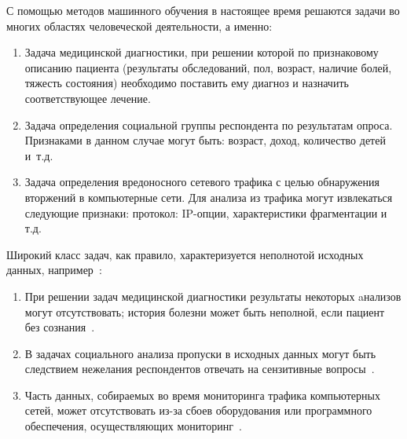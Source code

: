 
{\actuality} С помощью методов машинного обучения в настоящее время
решаются задачи во многих областях человеческой деятельности, а
именно:
\begin{enumerate}
  \item Задача медицинской диагностики, при решении которой по
    признаковому описанию пациента (результаты обследований, пол, возраст,
    наличие болей, тяжесть состояния) необходимо поставить ему диагноз и
    назначить соответствующее лечение.
  \item Задача определения социальной группы респондента по
    результатам опроса. Признаками в данном случае могут быть: возраст,
    доход, количество детей и~т.\:д.
  \item Задача определения вредоносного сетевого трафика с целью
    обнаружения вторжений в компьютерные сети. Для анализа из трафика
    могут извлекаться следующие признаки: протокол: IP-опции,
    характеристики фрагментации и т.д.
\end{enumerate}

Широкий класс задач, как правило, характеризуется неполнотой исходных
данных, например~\cite{garcia2009pattern}:
\begin{enumerate}
  \item При решении задач медицинской диагностики результаты некоторых
    aнализов могут отсутствовать; история болезни может быть неполной,
    если пациент без сознания~\cite{garcia2009pattern,liu2005analysis}.
  \item В задачах социального анализа пропуски в исходных данных могут
    быть следствием нежелания респондентов отвечать на сензитивные
    вопросы~\cite{liu2005analysis,zagnieva2008solving,rubin1987multiple}.
  \item Часть данных, собираемых во время мониторинга трафика
    компьютерных сетей, может отсутствовать из-за сбоев оборудования или
    программного обеспечения, осуществляющих мониторинг~\cite{garcia2009pattern}.
\end{enumerate}



